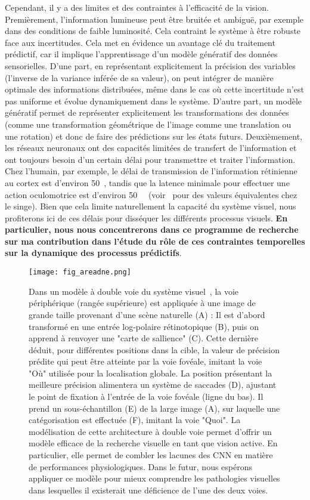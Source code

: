 Cependant, il y a des limites et des contraintes à l'efficacité de la
vision. Premièrement, l'information lumineuse peut être bruitée et
ambiguë, par exemple dans des conditions de faible luminosité. Cela
contraint le système à être robuste face aux incertitudes. Cela met en
évidence un avantage clé du traitement prédictif, car il implique
l'apprentissage d'un modèle génératif des données sensorielles. D'une
part, en représentant explicitement la précision des variables
(l'inverse de la variance inférée de sa valeur), on peut intégrer de
manière optimale des informations distribuées, même dans le cas où cette
incertitude n'est pas uniforme et évolue dynamiquement dans le système.
D'autre part, un modèle génératif permet de représenter explicitement
les transformations des données (comme une transformation géométrique de
l'image comme une translation ou une rotation) et donc de faire des
prédictions sur les états futurs. Deuxièmement, les réseaux neuronaux
ont des capacités limitées de transfert de l'information et ont toujours
besoin d'un certain délai pour transmettre et traiter l'information.
Chez l'humain, par exemple, le délai de transmission de l'information
rétinienne au cortex est d'environ 50~\ms, tandis que la latence minimale
pour effectuer une action oculomotrice est d'environ 50~\ms~\citep{Kirchner06}
 (voir~\citep{Lamme00} pour des valeurs
équivalentes chez le singe). Bien que cela limite naturellement la
capacité du système visuel, nous profiterons ici de ces délais pour
disséquer les différents processus visuels. {\bf En particulier, nous nous
concentrerons dans ce programme de recherche sur ma contribution dans l'étude
du rôle de ces contraintes
temporelles sur la dynamique des processus prédictifs}.
\begin{figure}[!ht]
\vspace{-0.25cm}%
\centerline{
  \texttt{[image: fig\_areadne.png]}
}
\caption{
Dans un modèle à double voie du système visuel~\citep{Dauce20}, la voie périphérique (rangée supérieure) est appliquée à une image de grande taille provenant d'une scène naturelle (A) : Il est d'abord transformé en une entrée log-polaire rétinotopique (B), puis on apprend à renvoyer une "carte de sallience" (C). Cette dernière déduit, pour différentes positions dans la cible, la valeur de précision prédite qui peut être atteinte par la voie fovéale, imitant la voie "Où" utilisée pour la localisation globale. La position présentant la meilleure précision alimentera un système de saccades (D), ajustant le point de fixation à l'entrée de la voie fovéale (ligne du bas). Il prend un sous-échantillon (E) de la large image (A), sur laquelle une catégorisation est effectuée (F), imitant la voie "Quoi".
La modélisation de cette architecture à double voie permet d'offrir un modèle efficace de la recherche visuelle en tant que vision active. En particulier, elle permet de combler les lacunes des CNN en matière de performances physiologiques. Dans le futur, nous espérons appliquer ce modèle pour mieux comprendre les pathologies visuelles dans lesquelles il existerait une déficience de l'une des deux voies.
}
\label{fig:JNJER22}
\end{figure}
